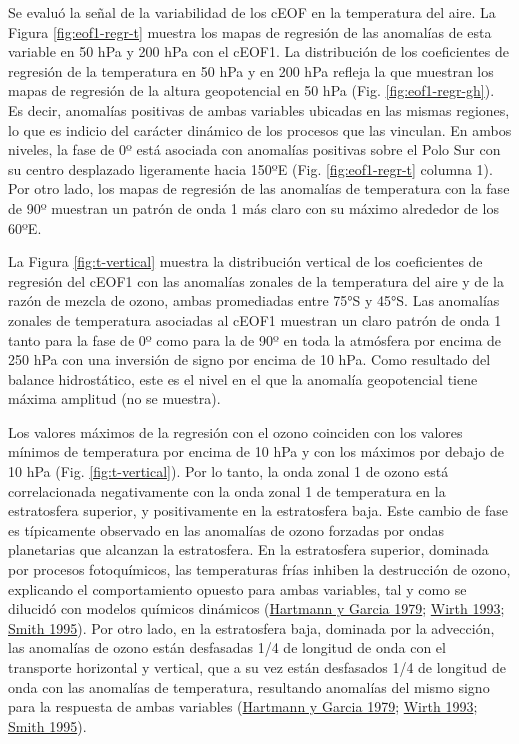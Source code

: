 \documentclass[12pt,oneside,a4paper]{reedthesis}
\begin{document}
Se evaluó la señal de la variabilidad de los cEOF en la temperatura del aire.
La Figura \ref{fig:eof1-regr-t} muestra los mapas de regresión de las anomalías de esta variable en 50 hPa y 200 hPa con el cEOF1.
La distribución de los coeficientes de regresión de la temperatura en 50 hPa y en 200 hPa refleja la que muestran los mapas de regresión de la altura geopotencial en 50 hPa (Fig. \ref{fig:eof1-regr-gh}).
Es decir, anomalías positivas de ambas variables ubicadas en las mismas regiones, lo que es indicio del carácter dinámico de los procesos que las vinculan.
En ambos niveles, la fase de 0º está asociada con anomalías positivas sobre el Polo Sur con su centro desplazado ligeramente hacia 150ºE (Fig. \ref{fig:eof1-regr-t} columna 1).
Por otro lado, los mapas de regresión de las anomalías de temperatura con la fase de 90º muestran un patrón de onda 1 más claro con su máximo alrededor de los 60ºE.

La Figura \ref{fig:t-vertical} muestra la distribución vertical de los coeficientes de regresión del cEOF1 con las anomalías zonales de la temperatura del aire y de la razón de mezcla de ozono, ambas promediadas entre 75°S y 45°S.
Las anomalías zonales de temperatura asociadas al cEOF1 muestran un claro patrón de onda 1 tanto para la fase de 0º como para la de 90º en toda la atmósfera por encima de 250 hPa con una inversión de signo por encima de 10 hPa.
Como resultado del balance hidrostático, este es el nivel en el que la anomalía geopotencial tiene máxima amplitud (no se muestra).

Los valores máximos de la regresión con el ozono coinciden con los valores mínimos de temperatura por encima de 10 hPa y con los máximos por debajo de 10 hPa (Fig. \ref{fig:t-vertical}).
Por lo tanto, la onda zonal 1 de ozono está correlacionada negativamente con la onda zonal 1 de temperatura en la estratosfera superior, y positivamente en la estratosfera baja.
Este cambio de fase es típicamente observado en las anomalías de ozono forzadas por ondas planetarias que alcanzan la estratosfera.
En la estratosfera superior, dominada por procesos fotoquímicos, las temperaturas frías inhiben la destrucción de ozono, explicando el comportamiento opuesto para ambas variables, tal y como se dilucidó con modelos químicos dinámicos (\protect\hyperlink{ref-hartmann1979}{Hartmann y Garcia 1979}; \protect\hyperlink{ref-wirth1993}{Wirth 1993}; \protect\hyperlink{ref-smith1995}{Smith 1995}).
Por otro lado, en la estratosfera baja, dominada por la advección, las anomalías de ozono están desfasadas 1/4 de longitud de onda con el transporte horizontal y vertical, que a su vez están desfasados 1/4 de longitud de onda con las anomalías de temperatura, resultando anomalías del mismo signo para la respuesta de ambas variables (\protect\hyperlink{ref-hartmann1979}{Hartmann y Garcia 1979}; \protect\hyperlink{ref-wirth1993}{Wirth 1993}; \protect\hyperlink{ref-smith1995}{Smith 1995}).
\end{document}
